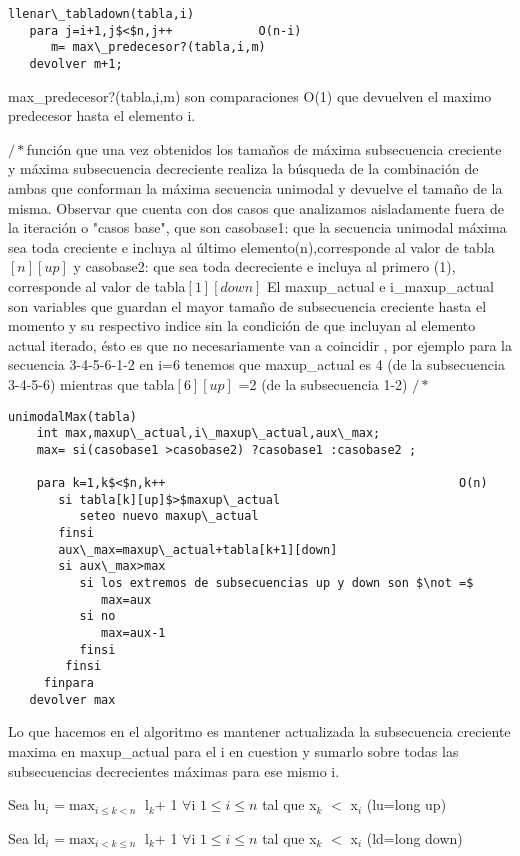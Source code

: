 \begin{verbatim}                        
llenar\_tabladown(tabla,i)             
   para j=i+1,j$<$n,j++			   O(n-i) 
      m= max\_predecesor?(tabla,i,m) 	
   devolver m+1;
\end{verbatim} 
max\_predecesor?(tabla,i,m) son comparaciones O(1) que devuelven el maximo predecesor hasta el elemento i. 

$/*$función que una vez obtenidos los tamaños de máxima subsecuencia creciente y máxima subsecuencia decreciente 
realiza la búsqueda de la combinación de ambas que conforman la máxima secuencia unimodal y devuelve el tamaño de la misma.
Observar que cuenta con dos casos que analizamos aisladamente fuera de la iteración o "casos base", que son casobase1: que la secuencia unimodal máxima sea toda creciente e incluya al último elemento(n),corresponde al valor de tabla$[n][up]$ y casobase2: que sea toda decreciente e incluya al primero (1), corresponde al valor de tabla$[1][down]$ 
El maxup\_actual e i\_maxup\_actual son variables que guardan el mayor tamaño de subsecuencia creciente hasta el momento y su respectivo indice sin la condición de que incluyan al elemento actual iterado, ésto es que no necesariamente van a coincidir , por ejemplo para la secuencia 3-4-5-6-1-2  en i=6 tenemos que maxup\_actual es 4 (de la subsecuencia 3-4-5-6) mientras que tabla$[6][up]$ =2 (de la subsecuencia 1-2) $/*$
\begin{verbatim}
unimodalMax(tabla)
    int max,maxup\_actual,i\_maxup\_actual,aux\_max; 	
    max= si(casobase1 >casobase2) ?casobase1 :casobase2 ;
	
	para k=1,k$<$n,k++          							   O(n)
	   si tabla[k][up]$>$maxup\_actual	
	      seteo nuevo maxup\_actual
       finsi 
       aux\_max=maxup\_actual+tabla[k+1][down]		   
	   si aux\_max>max
	      si los extremos de subsecuencias up y down son $\not =$
	         max=aux
	      si no 
	         max=aux-1
    	  finsi 
	    finsi
	 finpara   
   devolver max

\end{verbatim}

Lo que hacemos en el algoritmo es mantener actualizada la subsecuencia creciente maxima en maxup\_actual para el i en cuestion y sumarlo sobre todas las subsecuencias decrecientes máximas para ese mismo i. 

Sea  lu$_i$ =$\max_{i\leq k<n}$ l$_k$+ 1 $\forall$i $1\leq i \leq n$ tal que x$_k$ $<$ x$_i$  (lu=long up)

Sea  ld$_i$ =$\max_{i<k\leq n}$ l$_k$+ 1 $\forall$i $1\leq i \leq n$ tal que x$_k$ $<$ x$_i$  (ld=long down)

